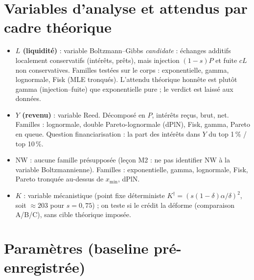 \documentclass[11pt,a4paper]{article}
\newcommand{\NW}{\mathrm{NW}}
\begin{document}
\section{Variables d'analyse et attendus par cadre théorique}

\begin{itemize}[leftmargin=1.4em, itemsep=2pt]
\item \textbf{$L$ (liquidité)} : variable Boltzmann--Gibbs \emph{candidate} :
  échanges additifs localement conservatifs (intérêts, prêts), mais injection
  $(1-s)P$ et fuite $cL$ non conservatives. Familles testées sur le corps :
  exponentielle, gamma, lognormale, Fisk (MLE tronqués). L'attendu théorique
  honnête est plutôt gamma (injection--fuite) que exponentielle pure ; le
  verdict est laissé aux données.
\item \textbf{$Y$ (revenu)} : variable Reed. Décomposé en $P$, intérêts reçus,
  brut, net. Familles : lognormale, double Pareto-lognormale (dPlN), Fisk,
  gamma, Pareto en queue. Question financiarisation : la part des intérêts
  dans $Y$ du top 1\,\% / top 10\,\%.
\item \textbf{$\NW$} : aucune famille présupposée (leçon M2 : ne pas
  identifier $\NW$ à la variable Boltzmannienne). Familles : exponentielle,
  gamma, lognormale, Fisk, Pareto tronquée au-dessus de $x_{\min}$, dPlN.
\item \textbf{$K$} : variable mécanistique (point fixe déterministe
  $K^\dagger = (s(1-\delta)\alpha/\delta)^2$, soit $\approx 203$ pour
  $s = 0{,}75$) ; on teste si le crédit la déforme (comparaison A/B/C), sans
  cible théorique imposée.
\end{itemize}

\section{Paramètres (baseline pré-enregistrée)}
\end{document}
